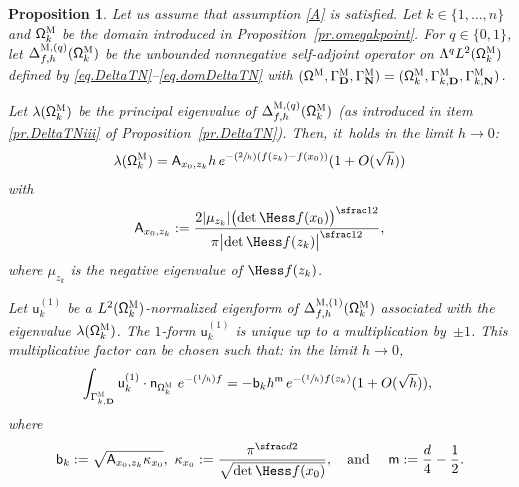 \documentclass[JEP,XML,SOM,Unicode,NoEqCountersInSection,NoFloatCountersInSection,published]{cedram}
\newcommand{\Psfrac}[2]{(\sfrac{#1}{#2})}
\newcommand{\quand}{\quad\text{and}\quad}
\newcommand{\mbf}[1]{\mathbf{#1}}
\theoremstyle{plain}
\newtheorem{proposition}{Proposition}
\theoremstyle{definition}
\begin{document}
\begin{proposition}
\label{pr.VP-DeltaTN}
Let us assume that assumption \ref{A} is satisfied. Let
$k\in\{1,\ldots,n\}$ and $ \mathsf \Omega_k^{\textsc{M}} $ be the
domain introduced in Proposition~\ref{pr.omegakpoint}. For $q\in\{0,1\}$, let $\Delta_{f,h}^{\textsc{M}, (q)}(\mathsf \Omega_k^{\textsc{M}})$ be the unbounded
nonnegative self-adjoint operator on
$ \Lambda^qL^{2} (\mathsf \Omega_k^{\textsc{M}})$ defined by \eqref{eq.DeltaTN}--\eqref{eq.domDeltaTN} with $(\mathsf \Omega^{\textsc{M}}, \Gamma^{\textsc{M}}_{\mbf D}, \Gamma^{\textsc{M}}_{\mbf N}) = (\mathsf \Omega_k^{\textsc{M}}, \Gamma_{k,\mbf D}^{\textsc{M}}, \Gamma_{k,\mbf N}^{\textsc{M}})$.

Let $\lambda(\mathsf \Omega_k^{\textsc{M}})$ be the principal
eigenvalue of $\Delta_{f,h}^{\textsc{M}, (q)}(\mathsf
\Omega_k^{\textsc{M}})$ (as introduced in item \eqref{pr.DeltaTNiii} of Proposition~\ref{pr.DeltaTN}). Then, it~holds in the limit $h\to 0$:
\begin{align}
\label{eq.DL-blambda1}
\lambda(\mathsf \Omega_k^{\textsc{M}})= \mathsf A_{x_0,z_k} h \, e^{-\Psfrac 2h (f(z_k)-f(x_0))} (1+O(\sqrt h))
\end{align}
with\vspace*{-4pt}
\begin{align}
\label{eq.ax0zk}
\mathsf A_{x_0,z_k}:=\frac{ 2\vert \mu_{z_k}\vert \bigl(\det \Hess f (x_0) \bigr)^{\sfrac12} }{ \pi \bigl\vert \det \Hess f (z_k) \bigr\vert^{\sfrac12}},
\end{align}
where $\mu_{z_k}$ is the negative eigenvalue of $\Hess f (z_k)$.

Let $\mathsf u^{(1)}_k$ be a $L^2(\mathsf
\Omega_k^{\textsc{M}})$-normalized eigenform of $
\Delta_{f,h}^{\textsc{M},(1)} (\mathsf \Omega_k^{\textsc{M}}) $
associated with the eigenvalue $\lambda(\mathsf
\Omega_k^{\textsc{M}})$. The $1$-form $\mathsf u^{(1)}_k$ is unique
up to a multiplication by~$\pm 1$. This multiplicative factor can be
chosen such that: in the limit $h\to 0$,\vspace*{-3pt}
\begin{align}\label{eq.DL-boun1}
\int_{\Gamma_{k,\mbf D}^{\textsc{M}}}\mathsf u^{(1)}_k \cdot \mathsf n_{ \mathsf \Omega_k^{\textsc{M}} }\ e^{-\Psfrac 1hf}=-\mathsf b_k h^{\mathsf m} \, e^{-\Psfrac 1h f(z_k)} (1+O(\sqrt h)),\
\end{align}
where\vspace*{-4pt}
\begin{align}\label{eq.kappa_0}
\mathsf b_k:=\sqrt{\mathsf A_{x_0,z_k}\kappa_{x_0}}, \ \kappa_{x_0}:=\frac{\pi^{\sfrac d2}}{ \sqrt{\det \Hess f(x_0)}}, \quand \ \mathsf m:= {\frac d4}-\frac 12.
\end{align}
\end{proposition}
\end{document}
